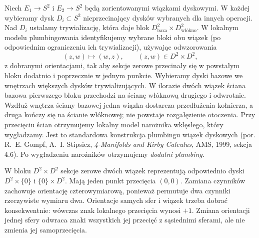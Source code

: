 \begin{definicja}
Niech $E_1\to S^2$ i $E_2\to S^2$ będą zorientowanymi
wiązkami dyskowymi. W każdej wybieramy dysk $D_i\subset S^2$
nieprzecinający dysków wybranych dla innych operacji.
Nad $D_i$ ustalamy trywializację, która daje blok
$D^2_{\text{baza}}\times D^2_{\text{włókno}}$.
W lokalnym modelu plumbingowania identyfikujemy wybrane
bloki obu wiązek (po odpowiednim ograniczeniu ich
trywializacji), używając odwzorowania
\[
(z,w)\longmapsto(w,z), \qquad (z,w)\in D^2\times D^2,
\]
z dobranymi orientacjami, tak aby sekcje zerowe przecinały się
w powstałym bloku dodatnio i poprzecznie w jednym punkcie.
Wybieramy dyski bazowe we wnętrzach większych
dysków trywializujących. W ilorazie dwóch wiązek
ściana bazowa pierwszego bloku przechodzi na
ścianę włóknową drugiego i odwrotnie. Wzdłuż
wnętrza ściany bazowej jedna wiązka dostarcza
przedłużenia kołnierza, a druga kończy się na
ścianie włóknowej; nie powstaje rozgałęzienie
otoczenia. Przy przecięciu ścian otrzymujemy
lokalny model narożnika wklęsłego, który
wygładzamy. Jest to standardowa konstrukcja
plumbingu wiązek dyskowych (por. R.~E. Gompf,
A.~I. Stipsicz, \emph{4-Manifolds and Kirby Calculus},
AMS, 1999, sekcja 4.6).
Po wygładzeniu narożników otrzymujemy \emph{dodatni plumbing}.
\end{definicja}

\begin{uwaga}
W bloku $D^2\times D^2$ sekcje zerowe dwóch wiązek
reprezentują odpowiednio dyski $D^2\times\{0\}$ i
$\{0\}\times D^2$. Mają jeden punkt przecięcia $(0,0)$.
Zamiana czynników zachowuje orientację czterowymiarową,
ponieważ permutuje dwa czynniki rzeczywiste wymiaru dwa.
Orientacje samych sfer i wiązek trzeba dobrać konsekwentnie:
wówczas znak lokalnego przecięcia wynosi $+1$. Zmiana
orientacji jednej sfery odwraca znaki wszystkich jej przecięć
z sąsiednimi sferami, ale nie zmienia jej samoprzecięcia.
\end{uwaga}

